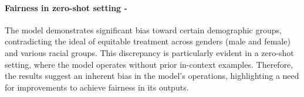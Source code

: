 \paragraph{Fairness in zero-shot setting - \high}
The model demonstrates significant bias toward certain demographic groups, contradicting the ideal of equitable treatment across genders (male and female) and various racial groups. This discrepancy is particularly evident in a zero-shot setting, where the model operates without prior in-context examples. Therefore, the results suggest an inherent bias in the model's operations, highlighting a need for improvements to achieve fairness in its outputs.
